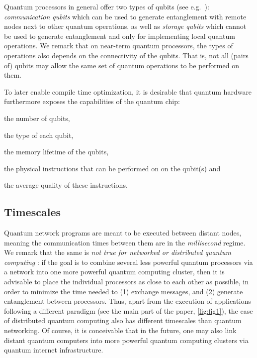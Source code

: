 Quantum processors in general offer two types of qubits (see e.g.~\cite{dahlberg_2019_egp}): \emph{communication qubits} which can be used to generate entanglement with remote nodes next to other quantum operations, as well as \emph{storage qubits} which cannot be used to generate entanglement and only for implementing local quantum operations. We remark that on near-term quantum processors, the types of operations also depends on the connectivity of the qubits. That is, not all (pairs of) qubits may allow the same set of quantum operations to be performed on them.

To later enable compile time optimization, it is desirable that quantum hardware furthermore exposes the capabilities of the quantum chip:
%
\begin{inlinelist}
\item the number of qubits,
\item the type of each qubit, 
\item the memory lifetime of the qubits,
\item the physical instructions that can be performed on on the qubit(s) and
\item the average quality of these instructions.
\end{inlinelist}

\subsection{Timescales}

Quantum network programs are meant to be executed between distant nodes, meaning the communication times between them are in the \emph{millisecond} regime. We remark that the same is \emph{not true for networked or distributed quantum computing }: if the goal is to combine several less powerful quantum processors via a network into one more powerful quantum computing cluster, then it is advisable to place the individual processors as close to each other as possible, in order to minimize the time needed to (1) exchange messages, and (2) generate entanglement between processors. Thus, apart from the execution of applications following a different paradigm (see the main part of the paper, \cref{fig:fig1}),
the case of distributed quantum computing also has different timescales than quantum networking. Of course, it is conceivable that in the future, one may also link distant quantum computers into more powerful quantum computing clusters via quantum internet infrastructure.


